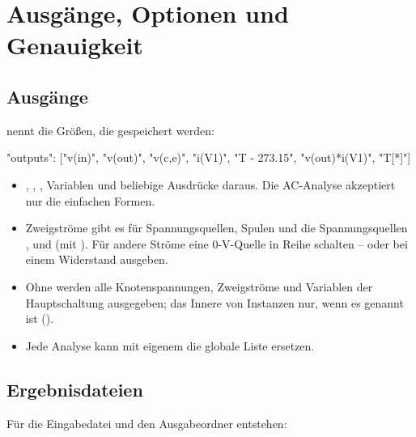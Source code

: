 \chapter{Ausgänge, Optionen und Genauigkeit}
\label{kap:format-ausgaben}

\section{Ausgänge}
\label{sec:ausgaenge}

 nennt die Größen, die gespeichert werden:

\begin{json}
"outputs": ["v(in)", "v(out)", "v(c,e)", "i(V1)", "T - 273.15", "v(out)*i(V1)", "T[*]"]
\end{json}

\begin{itemize}
  \item {}, , , Variablen und
    beliebige Ausdrücke daraus. Die AC-Analyse akzeptiert nur die
    einfachen Formen.
  \item Zweigströme gibt es für Spannungsquellen, Spulen und die
    Spannungsquellen ,  und  (mit ). Für
    andere Ströme eine 0-V-Quelle in Reihe schalten – oder bei einem
    Widerstand  ausgeben.
  \item Ohne  werden alle Knotenspannungen, Zweigströme und
    Variablen der Hauptschaltung ausgegeben; das Innere von Instanzen nur,
    wenn es genannt ist ().
  \item Jede Analyse kann mit eigenem  die globale Liste
    ersetzen.
\end{itemize}

\section{Ergebnisdateien}

Für die Eingabedatei  und den Ausgabeordner 
entstehen:

